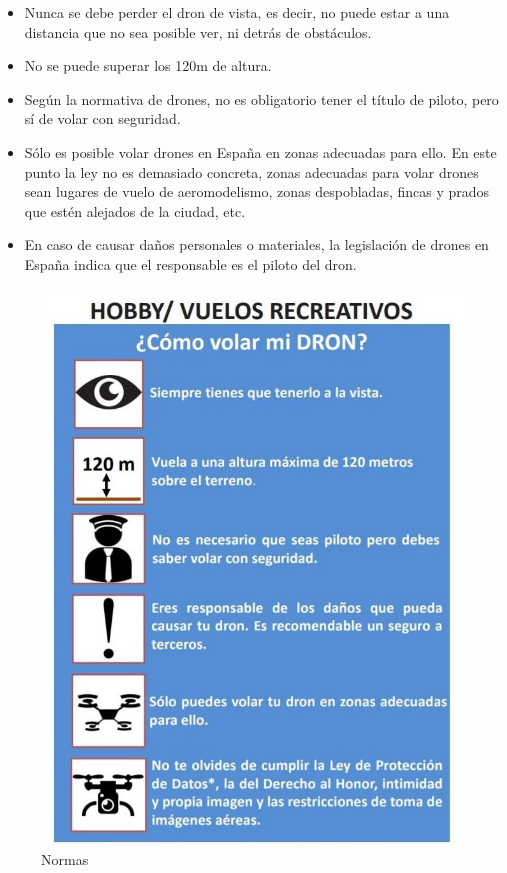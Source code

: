 \begin{itemize}
\item Nunca se debe perder el dron de vista, es decir, no puede estar a una distancia que no sea posible ver, ni detrás de obstáculos.
\item No se puede superar los 120m de altura.
\item Según la normativa de drones, no es obligatorio tener el título de piloto, pero sí de volar con seguridad.
\item Sólo es posible volar drones en España en zonas adecuadas para ello. En este punto la ley no es demasiado concreta, zonas adecuadas para volar drones sean lugares de vuelo de aeromodelismo, zonas despobladas, fincas y prados que estén alejados de la ciudad, etc.
\item En caso de causar daños personales o materiales, la legislación de drones en España indica que el responsable es el piloto del dron.

\end{itemize}
\begin{figure}[H]
  \centering
  \includegraphics[scale=0.3]{imagenes/normas.jpg}
  \caption{Normas}
  \label{fig:normas}
\end{figure}

